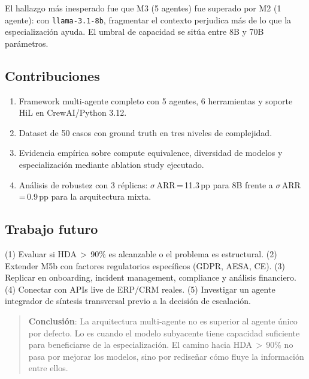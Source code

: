 \documentclass[preprint,12pt,authoryear]{elsarticle}
\begin{document}
El hallazgo m\'as inesperado fue que M3 (5 agentes) fue superado por M2 (1
agente): con \texttt{llama-3.1-8b}, fragmentar el contexto perjudica m\'as de
lo que la especializaci\'on ayuda.
El umbral de capacidad se sit\'ua entre 8B y 70B par\'ametros.

\subsection{Contribuciones}

\begin{enumerate}[label=(\arabic*)]
  \item Framework multi-agente completo con 5 agentes, 6 herramientas y soporte
        HiL en CrewAI/Python 3.12.
  \item Dataset de 50 casos con ground truth en tres niveles de complejidad.
  \item Evidencia emp\'irica sobre compute equivalence, diversidad de modelos y
        especializaci\'on mediante ablation study ejecutado.
  \item An\'alisis de robustez con 3 r\'eplicas: $\sigma$\,ARR\,=\,11.3\,pp
        para 8B frente a $\sigma$\,ARR\,=\,0.9\,pp para la arquitectura mixta.
\end{enumerate}

\subsection{Trabajo futuro}

(1) Evaluar si HDA\,$>$\,90\% es alcanzable o el problema es estructural.
(2) Extender M5b con factores regulatorios espec\'ificos (GDPR, AESA, CE).
(3) Replicar en onboarding, incident management, compliance y an\'alisis
financiero.
(4) Conectar con APIs live de ERP/CRM reales.
(5) Investigar un agente integrador de s\'intesis transversal previo a la
decisi\'on de escalaci\'on.

\begin{quote}
\textbf{Conclusi\'on}: La arquitectura multi-agente no es superior al agente
\'unico por defecto. Lo es cuando el modelo subyacente tiene capacidad suficiente
para beneficiarse de la especializaci\'on. El camino hacia HDA\,$>$\,90\% no
pasa por mejorar los modelos, sino por redise\~nar c\'omo fluye la informaci\'on
entre ellos.
\end{quote}



\end{document}

